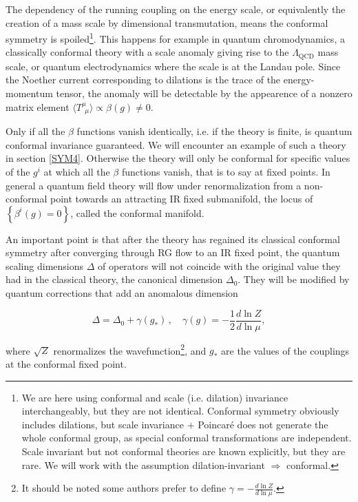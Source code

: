 The dependency of the running coupling on the energy scale, or equivalently the creation of a mass scale by dimensional transmutation, means the conformal symmetry is spoiled\footnote{We are here using conformal and scale (i.e. dilation) invariance interchangeably, but they are not identical. Conformal symmetry obviously includes dilations, but scale invariance $+$ Poincar\'e does not generate the whole conformal group, as special conformal transformations are independent. Scale invariant but not conformal theories are known explicitly\cite{scalebutnotconf}, but they are rare. We will work with the assumption dilation-invariant $\Rightarrow$ conformal.}. This happens for example in quantum chromodynamics, a classically conformal theory with a scale anomaly giving rise to the $\Lambda_\text{QCD}$ mass scale, or quantum electrodynamics where the scale is at the Landau pole. Since the Noether current corresponding to dilations is the trace of the energy-momentum tensor, the anomaly will be detectable by the appearence of a nonzero matrix element $\langle T^{\mu}_{\;\,\mu} \rangle \propto \beta(g) \neq 0$.

Only if all the $\beta$ functions vanish identically, i.e. if the theory is finite, is quantum conformal invariance guaranteed. We will encounter an example of such a theory in section \ref{SYM4}. Otherwise the theory will only be conformal for specific values of the $g^i$ at which all the $\beta$ functions vanish, that is to say at fixed points. In general a quantum field theory will flow under renormalization from a non-conformal point towards an attracting IR fixed submanifold, the locus of $\left\{ \beta^i(g) = 0 \right\}$, called the conformal manifold.

An important point is that after the theory has regained its classical conformal symmetry after converging through RG flow to an IR fixed point, the quantum scaling dimensions $\Delta$ of operators will not coincide with the original value they had in the classical theory, the canonical dimension $\Delta_0$. They will be modified by quantum corrections that add an anomalous dimension

\begin{equation}
	\Delta = \Delta_0 + \gamma(g_*)\,,\quad \gamma(g) = - \frac{1}{2}\frac{d \ln Z}{d \ln\mu},
	\label{}
\end{equation}

where $\sqrt Z$ renormalizes the wavefunction\footnote{It should be noted some authors prefer to define $\gamma = - \frac{d\ln Z}{d \ln \mu}$.}, and $g_*$ are the values of the couplings at the conformal fixed point.

